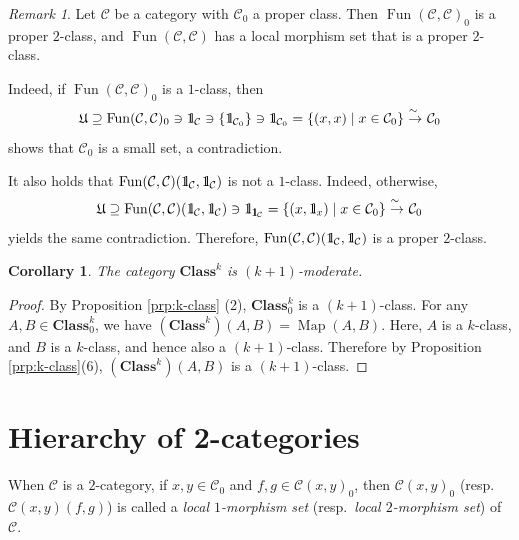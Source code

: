 \documentclass{surv-l}
\numberwithin{equation}{chapter}
\numberwithin{figure}{chapter}
\theoremstyle{plain}
\newtheorem{cor}[thm]{Corollary}
\theoremstyle{definition}
\theoremstyle{remark}
\newtheorem{rmk}[thm]{Remark}
\newcommand{\id}{1\kern-.25em{\text{{\rm l}}}}
\newcommand{\isoto}{\
  \raise.8ex\hbox{$^{\sim}$}\kern-.7em\hbox{$\to$}\ }
\DeclareMathOperator{\Fun}{Fun}
\DeclareMathOperator{\Map}{Map}
\begin{document}
\begin{rmk}\label{rmk:Fun-not-modt}
Let ${\mathcal{C}}$ be a category with ${\mathcal{C}}_0$ a proper class.
Then $\Fun({\mathcal{C}}, {\mathcal{C}})_0$ is a proper $2$-class, and
$\Fun({\mathcal{C}}, {\mathcal{C}})$ has a local morphism set that is a proper $2$-class.

Indeed, if $\Fun({\mathcal{C}}, {\mathcal{C}})_0$ is a $1$-class, then
\[
\mathfrak{U} \supseteq \Fun({\mathcal{C}}, {\mathcal{C}})_0 \ni \id_{{\mathcal{C}}} \ni \{\id_{{\mathcal{C}}_0}\} \ni \id_{{\mathcal{C}}_0}
= \{(x, x) \mid x \in {\mathcal{C}}_0\} \isoto {\mathcal{C}}_0
\]
shows that ${\mathcal{C}}_0$ is a small set, a contradiction.

It also holds that $\Fun({\mathcal{C}}, {\mathcal{C}})(\id_{\mathcal{C}}, \id_{\mathcal{C}})$ is not a $1$-class.
Indeed, otherwise,
\[
\mathfrak{U} \supseteq \Fun({\mathcal{C}}, {\mathcal{C}})(\id_{\mathcal{C}}, \id_{\mathcal{C}}) \ni \id_{\id_{\mathcal{C}}}
= \{(x, \id_x) \mid x \in {\mathcal{C}}_0\} \isoto {\mathcal{C}}_0
\]
yields the same contradiction.
Therefore, $\Fun({\mathcal{C}}, {\mathcal{C}})(\id_{\mathcal{C}}, \id_{\mathcal{C}})$ is a proper $2$-class.
\end{rmk}

\begin{cor}
The category $\mathbf{Class}^k$ is $(k+1)$-moderate.
\end{cor}

\begin{proof}
By Proposition \ref{prp:k-class} (2), $\mathbf{Class}^k_0$ is a $(k+1)$-class.
For any $A, B \in \mathbf{Class}^k_0$, we have $(\mathbf{Class}^k)(A, B) = \Map(A, B)$.
Here, $A$ is a $k$-class, and $B$ is a $k$-class, and hence also a $(k+1)$-class.
Therefore by Proposition \ref{prp:k-class}(6),
$(\mathbf{Class}^k)(A, B)$ is a $(k+1)$-class.
\end{proof}

\section{Hierarchy of 2-categories}When ${\mathcal{C}}$ is a $2$-category,
if $x, y \in {\mathcal{C}}_0$ and $f, g \in {\mathcal{C}}(x,y)_0$, then
${\mathcal{C}}(x, y)_0$ (resp.\ ${\mathcal{C}}(x, y)(f, g)$) is called
a \emph{local $1$-morphism set} (resp.\ \emph{local $2$-morphism set})
of ${\mathcal{C}}$.
\end{document}

